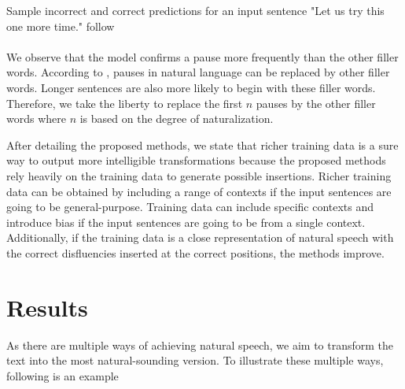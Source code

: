 \documentclass[journal]{IEEEtran}
\begin{document}
Sample incorrect and correct predictions for an input sentence "Let us try this one more time." follow
\noindent{}
\\
\noindent{}
\\

We observe that the model confirms a pause more frequently than the other filler words. According to \cite{cognition}, pauses in natural language can be replaced by other filler words. Longer sentences are also more likely to begin with these filler words. Therefore, we take the liberty to replace the first $n$ pauses by the other filler words where $n$ is based on the degree of naturalization. 

After detailing the proposed methods, we state that richer training data is a sure way to output more intelligible transformations because the proposed methods rely heavily on the training data to generate possible insertions. Richer training data can be obtained by including a range of contexts if the input sentences are going to be general-purpose. Training data can include specific contexts and introduce bias if the input sentences are going to be from a single context. Additionally, if the training data is a close representation of natural speech with the correct disfluencies inserted at the correct positions, the methods improve. 

\section{Results}

As there are multiple ways of achieving natural speech, we aim to transform the text into the most natural-sounding version. To illustrate these multiple ways, following is an example
\end{document}
